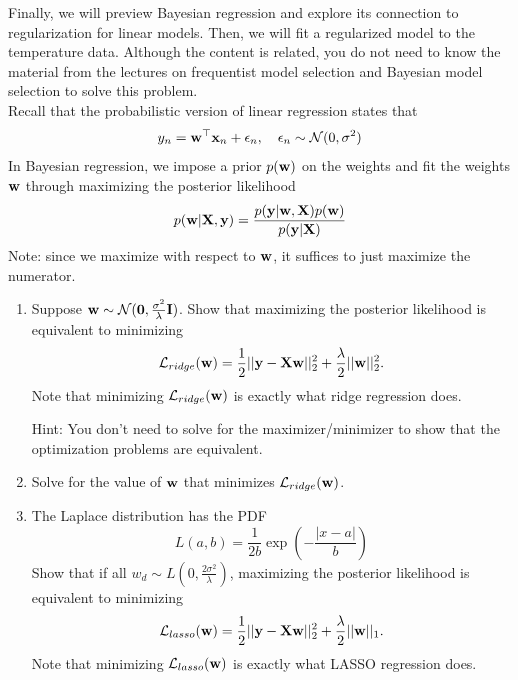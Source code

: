 \documentclass[submit]{harvardml}
\begin{document}
\begin{problem}

Finally, we will preview Bayesian regression and explore its connection to regularization for linear models. Then, we will fit a regularized model to the temperature data. Although the content is related, you do not need to know the material from the lectures on frequentist model selection and Bayesian model selection to solve this problem.  \\

\noindent Recall that the probabilistic version of linear regression states that 
\[y_n = \mathbf{w}^\top\mathbf{x}_n + \epsilon_n, \quad \epsilon_n \sim \mathcal{N}(0, \sigma^2)\]
In Bayesian regression, we impose a prior $p(\mathbf{w})$ on the weights and  fit the weights $\mathbf{w}$ through maximizing the posterior likelihood
\[p(\mathbf{w} | \mathbf{X}, \mathbf{y}) = \frac{p(\bold y | \mathbf{w}, \mathbf{X})p(\mathbf{w})}{p(\mathbf{y} | \mathbf{X})}\]
Note: since we maximize with respect to $\mathbf{w}$, it suffices to just maximize the numerator.

\begin{enumerate}
    \item Suppose $\mathbf{w} \sim \mathcal{N}(\mathbf{0},\frac{\sigma^2}{\lambda}\mathbf{I})$. Show that maximizing the posterior likelihood is equivalent to minimizing 
    \[\mathcal{L}_{ridge}(\mathbf{w}) = \frac{1}{2}||\mathbf{y} -\bold X\mathbf{w}||_2^2 + \frac{\lambda}{2}||\mathbf{w}||_2^2.\] 
    Note that minimizing $\mathcal{L}_{ridge}(\mathbf{w})$ is exactly what ridge regression does.
    
    Hint: You don't need to solve for the maximizer/minimizer to show that the optimization problems are equivalent.
    
    \item Solve for the value of $\mathbf{w}$ that minimizes $\mathcal L_{ridge}(\mathbf{w})$.

    \item The Laplace distribution has the PDF
   \[L(a,b) =\frac{1}{2b} \exp\left(-\frac{|x - a|}{b}\right)\]
Show that if all $w_d \sim L\left(0,\frac{2\sigma^2}{\lambda}\right)$, maximizing the posterior likelihood is equivalent to minimizing 
\[\mathcal{L}_{lasso}(\mathbf{w}) = \frac{1}{2}||\mathbf{y} -\bold X\mathbf{w}||_2^2  + \frac{\lambda}{2}||\mathbf{w}||_1.\] 
Note that minimizing $\mathcal{L}_{lasso}(\mathbf{w})$ is exactly what LASSO regression does.


\end{enumerate}
\end{problem}
\end{document}
